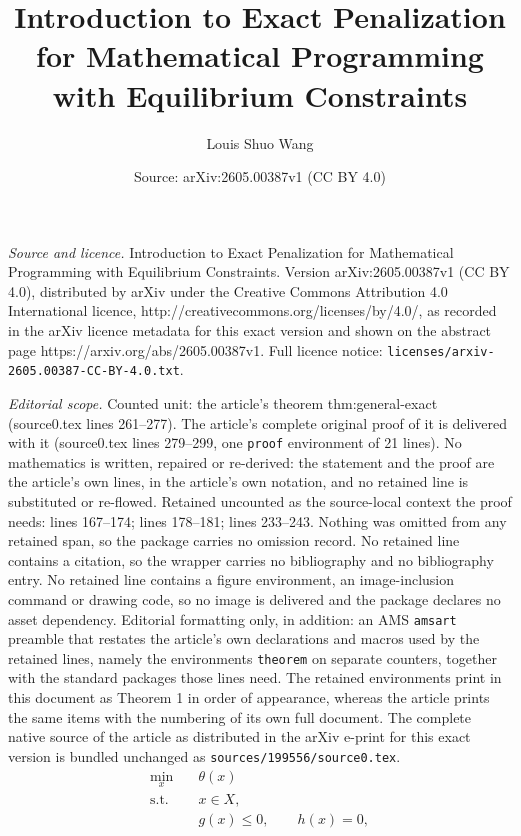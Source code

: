 \documentclass[10pt,a4paper]{amsart}
\title{Introduction to Exact Penalization for Mathematical Programming with Equilibrium Constraints}
\author{Louis Shuo Wang}
\date{Source: arXiv:2605.00387v1 (CC BY 4.0)}
\begin{document}
\maketitle

\noindent\emph{Source and licence.} Introduction to Exact Penalization for Mathematical Programming with Equilibrium Constraints. Version arXiv:2605.00387v1 (CC BY 4.0), distributed by arXiv under the Creative Commons Attribution 4.0 International licence, http://creativecommons.org/licenses/by/4.0/, as recorded in the arXiv licence metadata for this exact version and shown on the abstract page https://arxiv.org/abs/2605.00387v1. Full licence notice: \texttt{licenses/arxiv-2605.00387-CC-BY-4.0.txt}.\par\smallskip

\noindent\textit{Editorial scope.} Counted unit: the article's theorem thm:general-exact (source0.tex lines 261--277). The article's complete original proof of it is delivered with it (source0.tex lines 279--299, one \texttt{proof} environment of 21 lines). No mathematics is written, repaired or re-derived: the statement and the proof are the article's own lines, in the article's own notation, and no retained line is substituted or re-flowed.  Retained uncounted as the source-local context the proof needs: lines 167--174; lines 178--181; lines 233--243.  Nothing was omitted from any retained span, so the package carries no omission record.  No retained line contains a citation, so the wrapper carries no bibliography and no bibliography entry.  No retained line contains a figure environment, an image-inclusion command or drawing code, so no image is delivered and the package declares no asset dependency.  Editorial formatting only, in addition: an AMS \texttt{amsart} preamble that restates the article's own declarations and macros used by the retained lines, namely the environments \texttt{theorem} on separate counters, together with the standard packages those lines need.  The retained environments print in this document as Theorem 1 in order of appearance, whereas the article prints the same items with the numbering of its own full document.  The complete native source of the article as distributed in the arXiv e-print for this exact version is bundled unchanged as \texttt{sources/199556/source0.tex}.
\begin{equation}
\label{eq:nlp}
\begin{aligned}
    \min_x\quad & \theta(x)\\
    \text{s.t.}\quad & x\in X,\\
    & g(x)\le 0,\qquad h(x)=0,
\end{aligned}
\end{equation}
\end{document}

